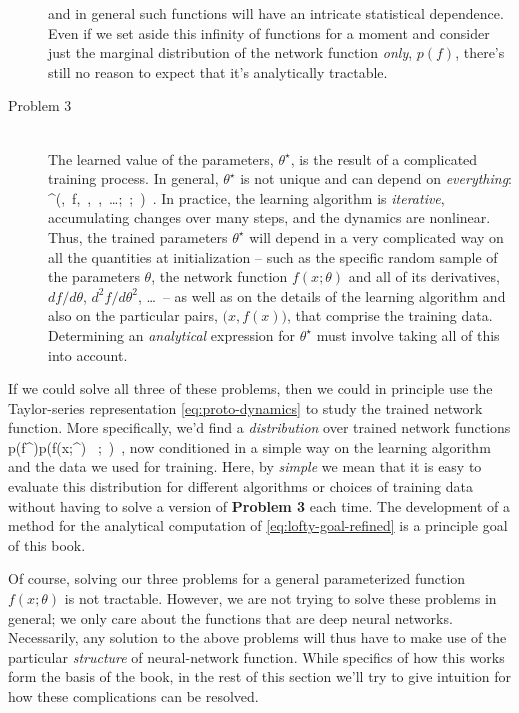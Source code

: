\begin{description}
and in general such functions will have an intricate statistical dependence.
Even if we set aside this infinity of functions for a moment and consider 
just
the
marginal distribution of the network function \emph{only}, $p(f)$, there's still no reason to expect that it's analytically tractable.
\item [Problem 3]~\\
The learned value of the parameters, $\theta^{\star}$, is the result of a complicated training process. In general, $\theta^{\star}$ is not unique and can depend on
\emph{everything}:
\be\label{eq:grand-probelm-3}
\theta^\star \equiv\le[\theta^{\star}\ri]\!\le(\theta,\, f,\, ,\, ,\, \ldots;\, ;\, \ri)\, .
\ee
In practice, the learning algorithm is \emph{iterative}, accumulating changes over many steps, and the dynamics are nonlinear. Thus, the trained parameters $\theta^{\star}$ will depend in a very complicated way on all the quantities at initialization -- such as the specific random sample of the  parameters $\theta$, the network function $f(x;\theta)$ and all of its derivatives, $df/d\theta$, $d^2f/d\theta^2$, \ldots\, -- as well as on the details of the 
learning algorithm and also on the particular pairs, $\big(x, f(x)\big)$, that comprise the training data. Determining an \emph{analytical} expression for $\theta^\star$ must involve taking all of this into account.
\end{description}
If we could solve all three of these problems, then we could in principle use the Taylor-series representation  \eqref{eq:proto-dynamics} to study the trained network function. More specifically, we'd find a \emph{distribution} over trained network functions
\be\label{eq:lofty-goal-refined}
p(f^{\star})\equiv p\Big(f(x;\theta^\star) \Big\vert\, ;\,  \Big)\, ,
\ee
now conditioned in a simple way on the learning algorithm and the data we used for training. Here, by \emph{simple} we mean that it is easy to evaluate this distribution for different algorithms or choices of training data without having to solve a version of  \textbf{Problem 3} each time. 
The development of a method for the
analytical computation of \eqref{eq:lofty-goal-refined} is a principle goal of this book.

Of course, solving our three problems for a general parameterized function $f(x;\theta)$ is not tractable. However, we are not trying to solve these problems in general; we only care about the functions that are deep neural networks. Necessarily, any solution to the above problems will thus have to make use of the particular \emph{structure} of neural-network function. %
While specifics of how this works form the basis of the book, in the rest of this section we'll try to give intuition for how these complications can be resolved.













